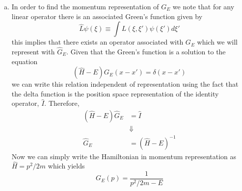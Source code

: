 \documentclass[11pt]{article}
\numberwithin{equation}{section}
\begin{document}
\begin{enumerate}[(a)]
\item In order to find the momentum representation of $G_E$ we note that for any linear 
operator there is an associated Green's function given by
$$\hat{L}\psi(\xi)\equiv\int L(\xi,\xi')\psi(\xi')d\xi'$$
this implies that there exists an operator associated with $G_E$ which we will represent with
$\hat{G}_E$. Given that the Green's function is a solution to the equation
$$(\hat{H}-E)G_E(x-x') = \delta(x-x')$$
we can write this relation independent of representation using the fact that the delta 
function is the position space representation of the identity operator, $\hat{I}$. Therefore,
\begin{align*}
(\hat{H}-E)\hat{G}_E &= \hat{I}\\
&\Downarrow\\
\hat{G}_E &= (\hat{H}-E)^{-1}
\end{align*}
Now we can simply write the Hamiltonian in momentum representation as $\hat{H} = p^2/2m$ 
which yields
$$G_E(p) = \frac{1}{p^2/2m-E}$$

\end{enumerate}
\end{document}
